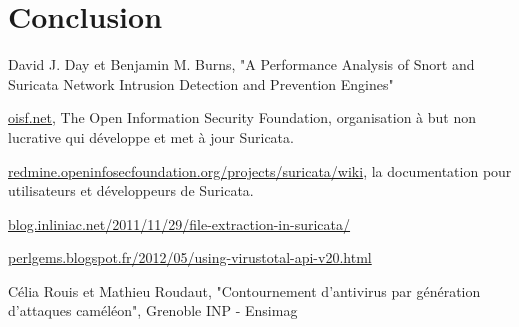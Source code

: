 \documentclass[smallextended]{svjour3}       %
\begin{document}
\section{Conclusion}
\label{2.3ids}

\begin{thebibliography}{}
%

David J. Day et Benjamin M. Burns, "A Performance Analysis of Snort and Suricata Network Intrusion Detection and Prevention Engines"

\url{oisf.net}, The Open Information Security Foundation, organisation à but non lucrative qui développe et met à jour Suricata.

\url{redmine.openinfosecfoundation.org/projects/suricata/wiki}, la documentation pour utilisateurs et développeurs de Suricata.

\url{blog.inliniac.net/2011/11/29/file-extraction-in-suricata/}

\url{perlgems.blogspot.fr/2012/05/using-virustotal-api-v20.html}

Célia Rouis et Mathieu Roudaut, "Contournement d'antivirus par génération d'attaques caméléon", Grenoble INP - Ensimag


\end{thebibliography}
\end{document}

